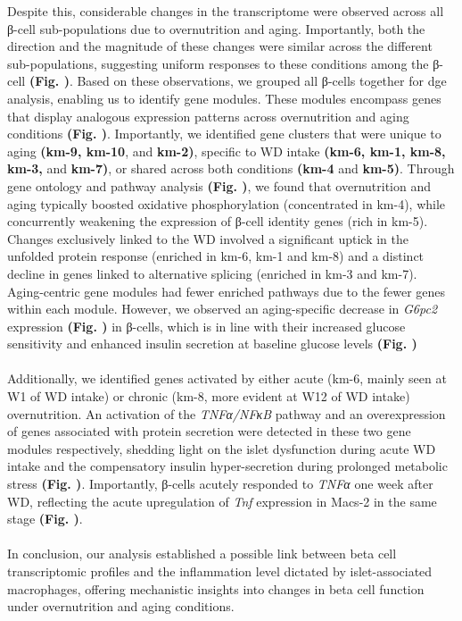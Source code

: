 Despite this, considerable changes in the transcriptome were observed across all β-cell sub-populations due to overnutrition and aging. Importantly, both the direction and the magnitude of these changes were similar across the different sub-populations, suggesting uniform responses to these conditions among the β-cell \textbf{(Fig. )}. Based on these observations, we grouped all β-cells together for \gls{dge} analysis, enabling us to identify gene modules. These modules encompass genes that display analogous expression patterns across overnutrition and aging conditions \textbf{(Fig. )}. Importantly, we identified gene clusters that were unique to aging \textbf{(km-9, km-10}, and \textbf{km-2)}, specific to WD intake \textbf{(km-6, km-1, km-8, km-3,} and \textbf{km-7)}, or shared across both conditions \textbf{(km-4} and \textbf{km-5)}. Through gene ontology and pathway analysis \textbf{(Fig. )}, we found that overnutrition and aging typically boosted oxidative phosphorylation (concentrated in km-4), while concurrently weakening the expression of β-cell identity genes (rich in km-5). Changes exclusively linked to the WD involved a significant uptick in the unfolded protein response (enriched in km-6, km-1 and km-8) and a distinct decline in genes linked to alternative splicing (enriched in km-3 and km-7). Aging-centric gene modules had fewer enriched pathways due to the fewer genes within each module. However, we observed an aging-specific decrease in \textit{G6pc2} expression \textbf{(Fig. )} in β-cells, which is in line with their increased glucose sensitivity and enhanced insulin secretion at baseline glucose levels \textbf{(Fig. )}\\\\
Additionally, we identified genes activated by either acute (km-6, mainly seen at W1 of WD intake) or chronic (km-8, more evident at W12 of WD intake) overnutrition. An activation of the \textit{TNFα/NFκB} pathway and an overexpression of genes associated with protein secretion were detected in these two gene modules respectively, shedding light on the islet dysfunction during acute WD intake and the compensatory insulin hyper-secretion during prolonged metabolic stress \textbf{(Fig. )}. Importantly, β-cells acutely responded to \textit{TNFα} one week after WD, reflecting the acute upregulation of \textit{Tnf} expression in Macs-2 in the same stage \textbf{(Fig. )}.\\\\
In conclusion, our analysis established a possible link between beta cell transcriptomic profiles and the inflammation level dictated by islet-associated macrophages, offering mechanistic insights into changes in beta cell function under overnutrition and aging conditions.

